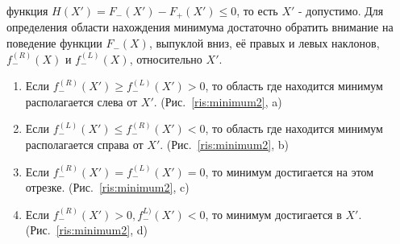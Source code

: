 \documentclass[12pt,a4paper]{article}
\begin{document}
\begin{enumerate}


\newpage
{} функция $H(X') = F_{-}(X')-F_{+}(X')\leqslant 0$, то есть $X'$ - допустимо. Для определения области нахождения минимума достаточно обратить внимание на  поведение функции  $F_{-}(X)$, выпуклой вниз, её правых и левых наклонов, $f_{-}^{(R)}(X)$ и $f_{-}^{(L)}(X)$, относительно  $X'$.\par
\begin{enumerate}
\item Если $f_{-}^{(R)}(X')\geqslant f_{-}^{(L)}(X')>0$, то область где находится минимум располагается слева от  $X'$. (Рис.~\ref{ris:minimum2}, a)\par
\item Если $f_{-}^{(L)}(X')\leqslant f_{-}^{(R)}(X')<0$, то область где находится минимум располагается справа от  $X'$. (Рис.~\ref{ris:minimum2}, b)\par
\item Если $f_{-}^{(R)}(X')= f_{-}^{(L)}(X')=0$, то минимум достигается на этом отрезке. (Рис.~\ref{ris:minimum2}, c)\par
\item Если $f_{-}^{(R)}(X')>0 ,f_{-}^{L)}(X')<0$, то минимум достигается в $X'$. (Рис.~\ref{ris:minimum2}, d)\par
\end{enumerate}


\end{enumerate}
\end{document}
